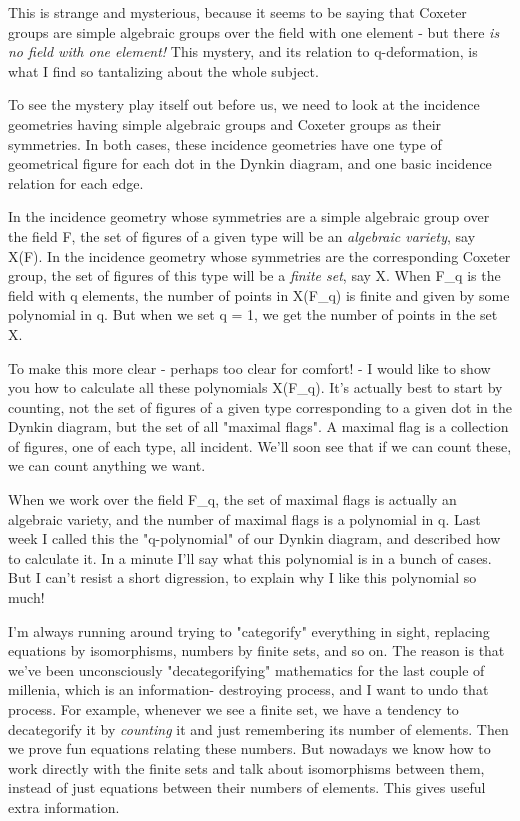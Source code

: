 This is strange and mysterious, because it seems to be saying that
Coxeter groups are simple algebraic groups over the field with one
element - but there \emph{is no field with one element!}  This mystery, 
and its relation to q-deformation, is what I find so tantalizing 
about the whole subject.  

To see the mystery play itself out before us, we need to look at the
incidence geometries having simple algebraic groups and Coxeter groups
as their symmetries.  In both cases, these incidence geometries have one
type of geometrical figure for each dot in the Dynkin diagram, and one
basic incidence relation for each edge.  

In the incidence geometry whose symmetries are a simple algebraic group
over the field F, the set of figures of a given type will be an
\emph{algebraic variety}, say X(F).  In the incidence geometry whose
symmetries are the corresponding Coxeter group, the set of figures of
this type will be a \emph{finite set}, say X.  When F_{q} is the
field with q elements, the number of points in X(F_{q}) is
finite and given by some polynomial in q.  But when we set q = 1, we get
the number of points in the set X.

To make this more clear - perhaps too clear for comfort! - I would like
to show you how to calculate all these polynomials X(F_{q}).
It's actually best to start by counting, not the set of figures of a
given type corresponding to a given dot in the Dynkin diagram, but the
set of all "maximal flags".  A maximal flag is a collection of
figures, one of each type, all incident.  We'll soon see that if we can
count these, we can count anything we want.

When we work over the field F_{q}, the set of maximal flags is
actually an algebraic variety, and the number of maximal flags is a
polynomial in q.  Last week I called this the "q-polynomial"
of our Dynkin diagram, and described how to calculate it.  In a minute
I'll say what this polynomial is in a bunch of cases.  But I can't
resist a short digression, to explain why I like this polynomial so
much!

I'm always running around trying to "categorify" everything in
sight, replacing equations by isomorphisms, numbers by finite sets, and
so on.  The reason is that we've been unconsciously
"decategorifying" mathematics for the last couple of millenia,
which is an information- destroying process, and I want to undo that
process.  For example, whenever we see a finite set, we have a tendency
to decategorify it by \emph{counting} it and just remembering its number of
elements.  Then we prove fun equations relating these numbers.  But
nowadays we know how to work directly with the finite sets and talk
about isomorphisms between them, instead of just equations between their
numbers of elements.  This gives useful extra information.

